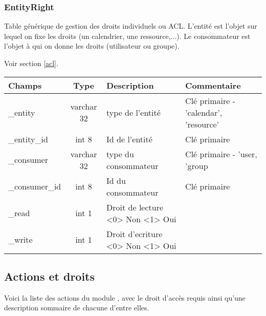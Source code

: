 \subsubsection{EntityRight}

Table générique de gestion des droits individuels ou ACL.
L'entité est l'objet sur lequel on fixe les droits (un calendrier, une ressource,...).
Le consommateur est l'objet à qui on donne les droits (utilisateur ou groupe).

Voir section \ref{acl}.\\

\begin{tabular}{|p{3cm}|c|p{5.4cm}|p{2.6cm}|}
\hline
\textbf{Champs} & \textbf{Type} & \textbf{Description} & \textbf{Commentaire} \\
\hline
\_entity &varchar 32 & type de l'entité & Clé primaire - 'calendar', 'resource'\\
\hline
\_entity\_id & int 8 & Id de l'entité & Clé primaire\\
\hline
\_consumer & varchar 32 & type du consommateur & Clé primaire - 'user, 'group\\
\hline
\_consumer\_id & int 8 & Id du consommateur & Clé primaire\\
\hline 
\_read & int 1 & Droit de lecture <0> Non <1> Oui  & \\
\hline
\_write & int 1 & Droit d'ecriture <0> Non <1> Oui & \\
\hline
\end{tabular}


\subsection{Actions et droits}

Voici la liste des actions du module \agenda, avec le droit d'accès requis 
ainsi qu'une description sommaire de chacune d'entre elles.\\

